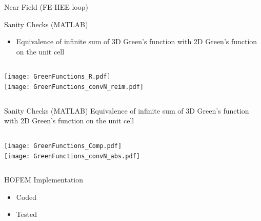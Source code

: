 \begin{frame}[allowframebreaks]{Near Field (FE-IIEE loop)}
  
  \begin{block}{Sanity Checks (MATLAB)}
    \begin{itemize}
    \item Equivalence of infinite sum of 3D Green's function with 2D
      Green's function on the unit cell 
  \end{itemize}
    \begin{columns}%
      \texttt{[image: GreenFunctions\_R.pdf]} \\
      \texttt{[image: GreenFunctions\_convN\_reim.pdf]} \\
    \end{columns}
  \end{block}

  \framebreak %

  \begin{block}{Sanity Checks (MATLAB)}
    Equivalence of infinite sum of 3D Green's function with 2D Green's
    function on the unit cell
    \begin{columns}%
       \texttt{[image: GreenFunctions\_Comp.pdf]} \\
      \texttt{[image: GreenFunctions\_convN\_abs.pdf]} \\
    \end{columns}
  \end{block}

  \framebreak %

  \begin{block}{HOFEM Implementation}

    \begin{itemize}
    \item Coded
    \item Tested
    \end{itemize}
    

\end{block}
\end{frame}
